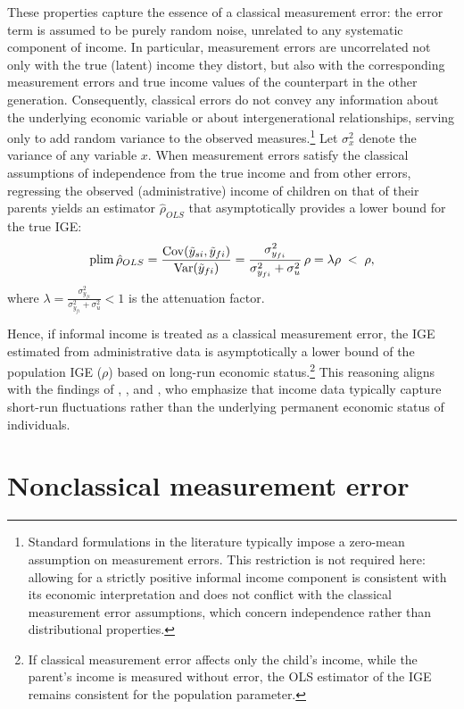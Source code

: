These properties capture the essence of a classical measurement error: the error term is assumed to be purely random noise, unrelated to any systematic component of income. In particular, measurement errors are uncorrelated not only with the true (latent) income they distort, but also with the corresponding measurement errors and true income values of the counterpart in the other generation. Consequently, classical errors do not convey any information about the underlying economic variable or about intergenerational relationships, serving only to add random variance to the observed measures.\footnote{Standard formulations in the literature typically impose a zero-mean assumption on measurement errors. This restriction is not required here: allowing for a strictly positive informal income component is consistent with its economic interpretation and does not conflict with the classical measurement error assumptions, which concern independence rather than distributional properties.}
Let $\sigma_x^2$ denote the variance of any variable $x$. When measurement errors satisfy the classical assumptions of independence from the true income and from other errors, regressing the observed (administrative) income of children on that of their parents yields an estimator $\hat{\rho}_{OLS}$ that asymptotically provides a lower bound for the true IGE:
\[
\operatorname*{plim} \hat{\rho}_{OLS} 
= \frac{\operatorname{Cov}(\tilde{y}_{si},\tilde{y}_{fi})}{\operatorname{Var}(\tilde{y}_{fi})}
= \frac{ \sigma_{y_{fi}}^2}{ \sigma_{y_{fi}}^2+\sigma^2_u}\,\rho = \lambda\rho
\;<\; \rho,
\]
where $\lambda =\frac{ \sigma_{y_{fi}}^2}{ \sigma_{y_{fi}}^2+\sigma^2_u}<1$ is the attenuation factor.

Hence, if informal income is treated as a classical measurement error, the IGE estimated from administrative data is asymptotically a lower bound of the population IGE ($\rho$) based on long-run economic status.\footnote{If classical measurement error affects only the child’s income, while the parent’s income is measured without error, the OLS estimator of the IGE remains consistent for the population parameter.}  
This reasoning aligns with the findings of \textcite{Solon_1992}, \textcite{Zimmerman_1992}, and \textcite{Björklund_1997}, who emphasize that income data typically capture short-run fluctuations rather than the underlying permanent economic status of individuals.


\section{Nonclassical measurement error}

